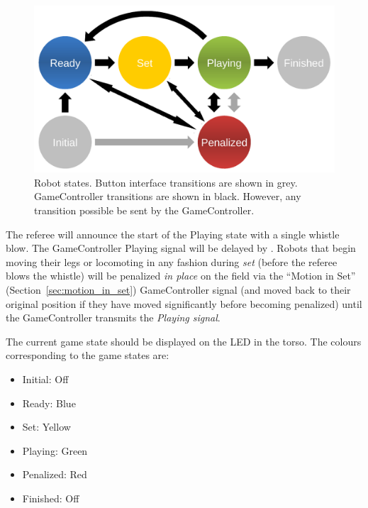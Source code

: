 \begin{figure}[t]
	\centerline{\includegraphics[width=0.9\columnwidth]{figs/states.pdf}}
	\caption{Robot states. Button interface transitions are shown in grey. GameController transitions are shown in black. However, any transition possible  be sent by the GameController.}
	\label{fig:robot_states}
\end{figure}

The referee will announce the start of the Playing state with a single whistle blow.
The GameController Playing signal will be delayed by \PlayingDelayTime.
Robots that begin moving their legs or locomoting in any fashion during \emph{set} (\ie before the referee blows the whistle) will be penalized \textit{in place} on the field via the ``Motion in Set'' (\cf Section~\ref{sec:motion_in_set}) GameController signal (and moved back to their original position if they have moved significantly before becoming penalized) until the GameController transmits the \emph{Playing signal}.

The current game state should be displayed on the LED in the torso. The colours corresponding to the game states are:

\begin{itemize}
	
	\item Initial: Off
	
	\item Ready: Blue
	
	\item Set: Yellow
	
	\item Playing: Green
	
	\item Penalized: Red
	
	\item Finished: Off
	
\end{itemize}

